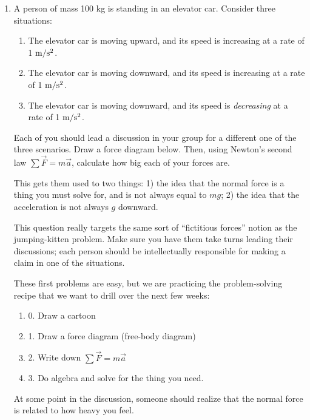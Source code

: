 \documentclass[12pt]{article}
\newcommand{\vsi}{\vspace{0.1in}}
\newcommand{\mss}{$\rm m/\rm s^2$}
\begin{document}
\begin{enumerate}

  \item A person of mass 100 kg is standing in an elevator car. Consider three situations:
    \begin{enumerate}
      \item The elevator car is moving upward, and its speed is increasing at a rate of 1 \mss.
      \item The elevator car is moving downward, and its speed is increasing at a rate of 1 \mss.
      \item The elevator car is moving downward, and its speed is {\it decreasing} at a rate of 1 \mss.
    \end{enumerate}

    Each of you should lead a discussion in your group for a different one of the three scenarios. Draw a force diagram below. Then, using Newton's second law
    $\sum \vec F = m \vec a$, calculate how big each of your forces are.
    
{    \color{Red}
	This gets them used to two things: 1) the idea that the normal force is a thing you must solve for, and is not always equal to $mg$; 2) the idea that the acceleration is not always $g$ downward.
	
	This question really targets the same sort of ``fictitious forces'' notion as the jumping-kitten problem. Make sure you have them take turns leading their discussions; each person should be intellectually responsible for
    making a claim in one of the situations. 
    
    These first problems are easy, but we are practicing the problem-solving recipe that we want to drill over the next few weeks:
    
    \begin{enumerate}
    	\item 0. Draw a cartoon
    	\item 1. Draw a force diagram (free-body diagram)
    	\item 2. Write down $\sum \vec F = m \vec a$
    	\item 3. Do algebra and solve for the thing you need.
    \end{enumerate}

At some point in the discussion, someone should realize that the normal force is related to how heavy you feel.
    
}

\vsi\vsi\vsi\vsi


\end{enumerate}
\end{document}
